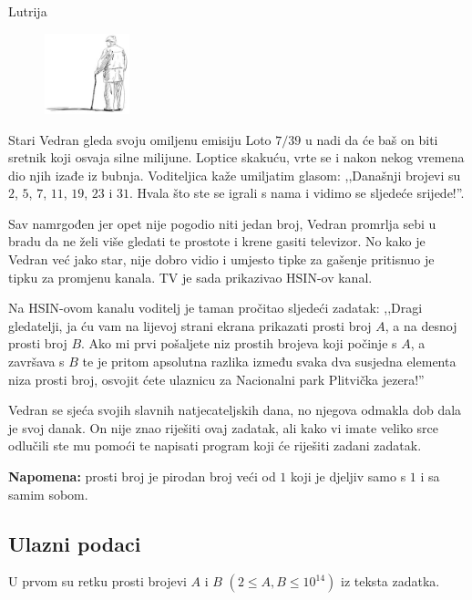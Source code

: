 \begin{statement}[
  problempoints=70,
  timelimit=1 sekunda,
  memorylimit=512 MiB,
]{Lutrija}

\setlength\intextsep{-0.1cm}
\begin{figure}
\centering
\includegraphics[width=0.22\textwidth]{img/vedran_kurdija.png}
\end{figure}

Stari Vedran gleda svoju omiljenu emisiju Loto $7/39$ u nadi da će baš on biti
sretnik koji osvaja silne milijune. Loptice skakuću, vrte se i nakon nekog
vremena dio njih izađe iz bubnja. Voditeljica kaže umiljatim glasom: ,,Današnji
brojevi su $2$, $5$, $7$, $11$, $19$, $23$ i $31$. Hvala što ste se igrali s
nama i vidimo se sljedeće srijede!''.

Sav namrgođen jer opet nije pogodio niti jedan broj, Vedran promrlja sebi u
bradu da ne želi više gledati te prostote i krene gasiti televizor. No kako je
Vedran već jako star, nije dobro vidio i umjesto tipke za gašenje pritisnuo je
tipku za promjenu kanala. TV je sada prikazivao HSIN-ov kanal.

Na HSIN-ovom kanalu voditelj je taman pročitao sljedeći zadatak: ,,Dragi
gledatelji, ja ću vam na lijevoj strani ekrana prikazati prosti broj $A$, a na
desnoj prosti broj $B$. Ako mi prvi pošaljete niz prostih brojeva koji počinje
s $A$, a završava s $B$ te je pritom apsolutna razlika između svaka dva susjedna
elementa niza prosti broj, osvojit ćete ulaznicu za Nacionalni park Plitvička
jezera!''

Vedran se sjeća svojih slavnih natjecateljskih dana, no njegova odmakla dob
dala je svoj danak. On nije znao riješiti ovaj zadatak, ali kako vi imate veliko
srce odlučili ste mu pomoći te napisati program koji će riješiti zadani zadatak.

\textbf{Napomena:} prosti broj je pirodan broj veći od $1$ koji je djeljiv samo
s $1$ i sa samim sobom.


\subsection*{Ulazni podaci}
U prvom su retku prosti brojevi $A$ i $B$ $(2 \le A, B \le 10^{14})$ iz teksta
zadatka.


\end{statement}
